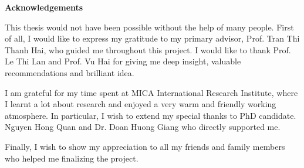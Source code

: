
\cleardoublepage
{}


\begin{center}
\textbf{Acknowledgements}
\end{center}

This thesis would not have been possible without the help of many people.
First of all, I would like to express my gratitude to my primary advisor, Prof. Tran Thi Thanh Hai, who guided me throughout this project.
I would like to thank Prof. Le Thi Lan and Prof. Vu Hai for giving me deep insight, valuable recommendations and brilliant idea.

I am grateful for my time spent at MICA International Research Institute, where I learnt a lot about research and enjoyed a very warm and friendly working atmosphere.
In particular, I wish to extend my special thanks to PhD candidate. Nguyen Hong Quan and Dr. Doan Huong Giang who directly supported me.

Finally, I wish to show my appreciation to all my friends and family members who helped me finalizing the project.

\resethead
